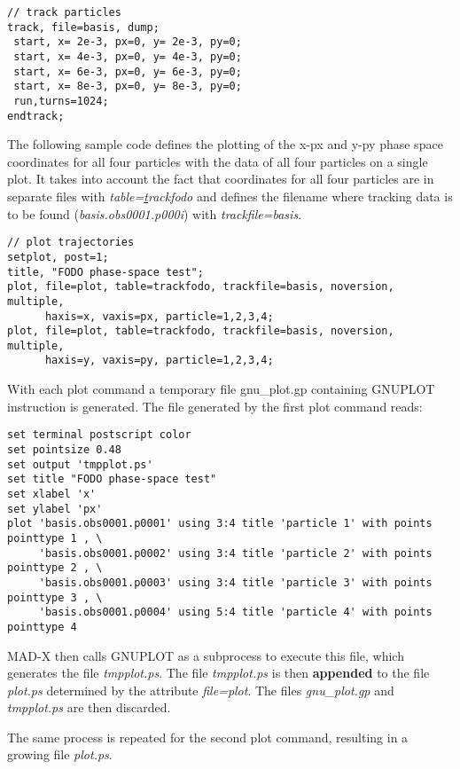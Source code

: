 \begin{verbatim}
// track particles
track, file=basis, dump;
 start, x= 2e-3, px=0, y= 2e-3, py=0;
 start, x= 4e-3, px=0, y= 4e-3, py=0;
 start, x= 6e-3, px=0, y= 6e-3, py=0;
 start, x= 8e-3, px=0, y= 8e-3, py=0;
 run,turns=1024;
endtrack;
\end{verbatim}

The following sample code defines the plotting of the x-px and y-py
phase space coordinates for all four particles with the data of all four
particles on a single plot.  
It takes into account the fact that coordinates for all four particles
are in separate files with 
\textit{table={\underline track}fodo} and defines the filename where tracking
data is to be found (\textit{basis.obs0001.p000i}) with
\textit{trackfile=basis}.  

\begin{verbatim}
// plot trajectories
setplot, post=1; 
title, "FODO phase-space test";
plot, file=plot, table=trackfodo, trackfile=basis, noversion, multiple, 
      haxis=x, vaxis=px, particle=1,2,3,4; 
plot, file=plot, table=trackfodo, trackfile=basis, noversion, multiple, 
      haxis=y, vaxis=py, particle=1,2,3,4;  
\end{verbatim}

With each plot command a temporary file gnu\_plot.gp containing GNUPLOT instruction is generated. 
The file generated by the first plot command reads: 

{\footnotesize \begin{verbatim}
set terminal postscript color
set pointsize 0.48
set output 'tmpplot.ps'
set title "FODO phase-space test"
set xlabel 'x'
set ylabel 'px'
plot 'basis.obs0001.p0001' using 3:4 title 'particle 1' with points pointtype 1 , \
     'basis.obs0001.p0002' using 3:4 title 'particle 2' with points pointtype 2 , \
     'basis.obs0001.p0003' using 3:4 title 'particle 3' with points pointtype 3 , \
     'basis.obs0001.p0004' using 5:4 title 'particle 4' with points pointtype 4 
\end{verbatim}}

MAD-X then calls GNUPLOT as a subprocess to execute this file, which
generates the file \textit{tmpplot.ps}.  
The file \textit{tmpplot.ps} is then {\bf appended} to the file
\textit{plot.ps} determined by the attribute \textit{file=plot}.  
The files \textit{gnu\_plot.gp} and \textit{tmpplot.ps} are then
discarded. 

The same process is repeated for the second plot command, resulting in a
growing file \textit{plot.ps}.




